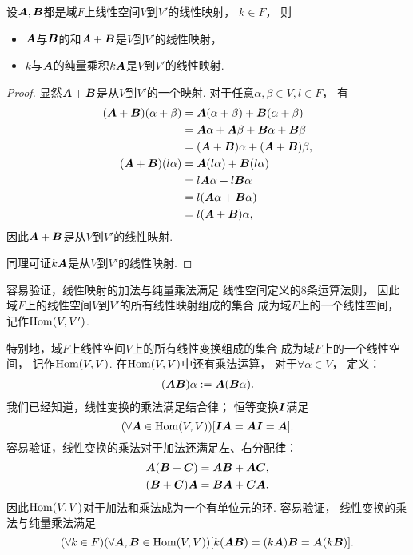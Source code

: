 \begin{proposition}
设\(\boldsymbol{A},\boldsymbol{B}\)都是域\(F\)上线性空间\(V\)到\(V'\)的线性映射，
\(k\in F\)，
则\begin{itemize}
	\item \(\boldsymbol{A}\)与\(\boldsymbol{B}\)的和\(\boldsymbol{A}+\boldsymbol{B}\)是\(V\)到\(V'\)的线性映射，
	\item \(k\)与\(\boldsymbol{A}\)的纯量乘积\(k\boldsymbol{A}\)是\(V\)到\(V'\)的线性映射.
\end{itemize}
\begin{proof}
显然\(\boldsymbol{A}+\boldsymbol{B}\)是从\(V\)到\(V'\)的一个映射.
对于任意\(\alpha,\beta \in V,
l \in F\)，
有\begin{align*}
	(\boldsymbol{A}+\boldsymbol{B})(\alpha+\beta)
	&= \boldsymbol{A}(\alpha+\beta) + \boldsymbol{B}(\alpha+\beta) \\
	&= \boldsymbol{A}\alpha + \boldsymbol{A}\beta + \boldsymbol{B}\alpha + \boldsymbol{B}\beta \\
	&= (\boldsymbol{A}+\boldsymbol{B})\alpha + (\boldsymbol{A}+\boldsymbol{B})\beta, \\
	(\boldsymbol{A}+\boldsymbol{B})(l\alpha)
	&= \boldsymbol{A}(l\alpha) + \boldsymbol{B}(l\alpha) \\
	&= l\boldsymbol{A}\alpha + l\boldsymbol{B}\alpha \\
	&= l(\boldsymbol{A}\alpha + \boldsymbol{B}\alpha) \\
	&= l(\boldsymbol{A}+\boldsymbol{B}) \alpha,
\end{align*}
因此\(\boldsymbol{A}+\boldsymbol{B}\)是从\(V\)到\(V'\)的线性映射.

同理可证\(k\boldsymbol{A}\)是从\(V\)到\(V'\)的线性映射.
\end{proof}
\end{proposition}

容易验证，线性映射的加法与纯量乘法满足
线性空间定义的8条运算法则，
因此域\(F\)上的线性空间\(V\)到\(V'\)的所有线性映射组成的集合
成为域\(F\)上的一个线性空间，
记作\(\operatorname{Hom}(V,V')\).

特别地，域\(F\)上线性空间\(V\)上的所有线性变换组成的集合
成为域\(F\)上的一个线性空间，
记作\(\operatorname{Hom}(V,V)\).
在\(\operatorname{Hom}(V,V)\)中还有乘法运算，
对于\(\forall\alpha \in V\)，
定义：\begin{gather*}
	(\boldsymbol{A}\boldsymbol{B})\alpha
	:=
	\boldsymbol{A}(\boldsymbol{B}\alpha).
\end{gather*}
我们已经知道，线性变换的乘法满足结合律；
恒等变换\(\boldsymbol{I}\)满足\[
	(\forall\boldsymbol{A}\in\operatorname{Hom}(V,V))
	[\boldsymbol{I}\boldsymbol{A}=\boldsymbol{A}\boldsymbol{I}=\boldsymbol{A}].
\]
容易验证，线性变换的乘法对于加法还满足左、右分配律：\begin{gather*}
	\boldsymbol{A}(\boldsymbol{B}+\boldsymbol{C})=\boldsymbol{A}\boldsymbol{B}+\boldsymbol{A}\boldsymbol{C}, \\
	(\boldsymbol{B}+\boldsymbol{C})\boldsymbol{A}=\boldsymbol{B}\boldsymbol{A}+\boldsymbol{C}\boldsymbol{A}.
\end{gather*}
因此\(\operatorname{Hom}(V,V)\)对于加法和乘法成为一个有单位元的环.
容易验证，
线性变换的乘法与纯量乘法满足\[
	(\forall k\in F)
	(\forall\boldsymbol{A},\boldsymbol{B}\in\operatorname{Hom}(V,V))
	[
		k(\boldsymbol{A}\boldsymbol{B})
		=(k\boldsymbol{A})\boldsymbol{B}
		=\boldsymbol{A}(k\boldsymbol{B})
	].
\]


